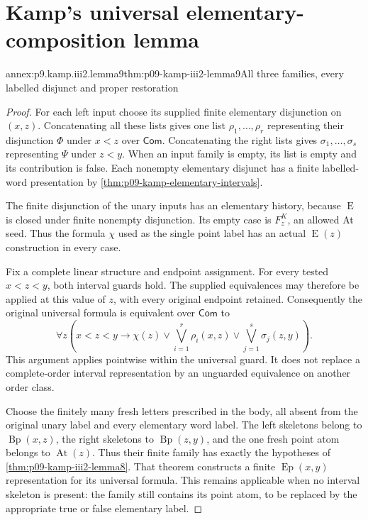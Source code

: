 
\section{Kamp's universal elementary-composition lemma}
\label{sec:annex-p09-kamp-iii2-lemma9}

\begin{annexitem}{annex:p9.kamp.iii2.lemma9}{thm:p09-kamp-iii2-lemma9}{All three families, every labelled disjunct and proper restoration}
\begin{proof}
For each left input choose its supplied finite elementary disjunction
on \((x,z)\). Concatenating all these lists gives one list
\(\rho_1,\ldots,\rho_r\) representing their disjunction \(\Phi\)
under \(x<z\) over \(\mathsf{Com}\). Concatenating the
right lists gives \(\sigma_1,\ldots,\sigma_s\) representing
\(\Psi\) under \(z<y\). When an input family is empty,
its list is empty and its contribution is false. Each nonempty
elementary disjunct has a finite labelled-word presentation by
\cref{thm:p09-kamp-elementary-intervals}.

The finite disjunction of the unary inputs has an elementary history,
because \(\operatorname{E}\) is closed under finite nonempty
disjunction. Its empty case is \(F^K_z\), an allowed At seed.
Thus the formula \(\chi\) used as the single point label
has an actual \(\operatorname{E}(z)\) construction in every case.

Fix a complete linear structure and endpoint assignment. For every
tested \(x<z<y\), both interval guards hold. The supplied
equivalences may therefore be applied at this value of \(z\),
with every original endpoint retained. Consequently the original
universal formula is equivalent over \(\mathsf{Com}\) to
\[
 \forall z\left(x<z<y\to
   \chi(z)\lor\bigvee_{i=1}^r\rho_i(x,z)
                    \lor\bigvee_{j=1}^s\sigma_j(z,y)\right).
 \tag{1}
\]
This argument applies pointwise within the universal guard. It does
not replace a complete-order interval representation by an unguarded
equivalence on another order class.

Choose the finitely many fresh letters prescribed in the body, all
absent from the original unary label and every elementary word label.
The left skeletons belong to \(\operatorname{Bp}(x,z)\), the
right skeletons to \(\operatorname{Bp}(z,y)\), and the one
fresh point atom belongs to \(\operatorname{At}(z)\).
Thus their finite family has exactly the hypotheses of
\cref{thm:p09-kamp-iii2-lemma8}. That theorem constructs a
finite \(\operatorname{Ep}(x,y)\) representation for its universal
formula. This remains applicable when no interval skeleton is present:
the family still contains its point atom, to be replaced by the
appropriate true or false elementary label.


\end{proof}
\end{annexitem}
